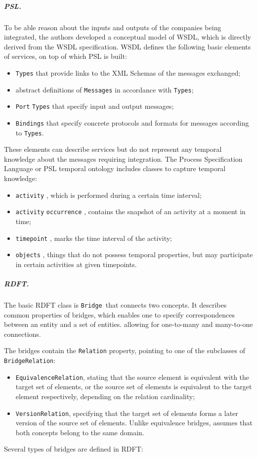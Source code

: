 \documentclass{fast_latex}
\begin{document}
\subparagraph{PSL.}
To be able reason about the inputs and outputs of the companies being
integrated, the authors developed a conceptual model of WSDL, which is
directly derived from the WSDL specification. WSDL defines the
following basic elements of services, on top of which PSL is built: 

\begin{itemize}
\item \texttt{Types} that provide links to the XML Schemas
of the messages exchanged; 
\item abstract definitions of \texttt{Messages} in
accordance with \texttt{Types}; 
\item \texttt{Port} \texttt{Types} that
specify input and output messages; 
\item \texttt{Bindings} that specify concrete protocols and
formats for messages according to \texttt{Types}. 
\end{itemize}
These elements can describe services but do not represent any temporal
knowledge about the messages requiring integration. The Process
Specification Language or PSL temporal ontology includes classes to
capture temporal knowledge: 

\begin{itemize}
\item \texttt{activity} , which is performed during a
certain time interval; 
\item \texttt{activity} \texttt{occurrence} ,
contains the snapshot of an activity at a moment in time; 
\item \texttt{timepoint} , marks the time interval of the
activity; 
\item \texttt{objects} , things that do not possess
temporal properties, but may participate in certain activities at given
timepoints. 
\end{itemize}
\subparagraph{RDFT.}
The basic RDFT class is \texttt{Bridge }that connects two
concepts. It describes common properties of bridges, which enables one
to specify correspondences between an entity and a set of entities.
allowing for one-to-many and many-to-one connections. 

The bridges contain the \texttt{Relation} property,
pointing to one of the subclasses of
\texttt{BridgeRelation}: 

\begin{itemize}
\item \texttt{EquivalenceRelation}, stating that the source
element is equivalent with the target set of elements, or the source
set of elements is equivalent to the target element respectively,
depending on the relation cardinality; 
\item \texttt{VersionRelation}, specifying that the target
set of elements forms a later version of the source set of elements.
Unlike equivalence bridges, assumes that both concepts belong to the
same domain. 
\end{itemize}
Several types of bridges are defined in RDFT: 
\end{document}
